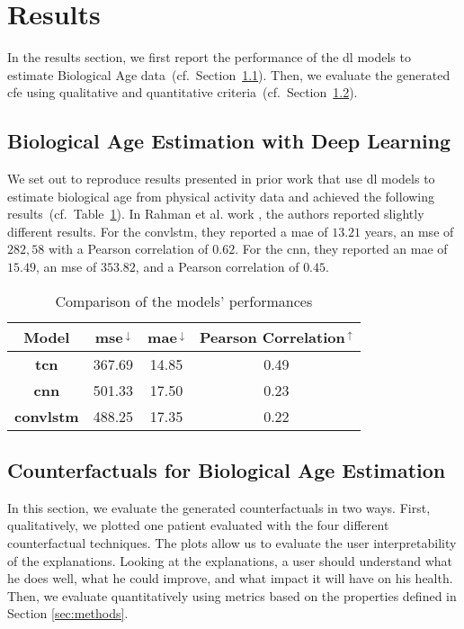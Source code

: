 \section{Results}
\label{sec:results}


In the results section, we first report the performance of the \gls{dl} models to estimate Biological Age data~(cf.~Section~\ref{sec:results:dl-training}). Then, we evaluate the generated \gls{cfe} using qualitative and quantitative criteria~(cf.~Section~\ref{sec:results:cf}).

\subsection{Biological Age Estimation with Deep Learning}
\label{sec:results:dl-training}
We set out to reproduce results presented in prior work \cite{pyrkov_extracting_2018, rahman_deep_2019} that use \gls{dl} models to estimate biological age from physical activity data and achieved the following results~(cf.~Table~\ref{tab:models}).
In Rahman et al. work \cite{rahman_deep_2019}, the authors reported slightly different results. For the \gls{convlstm}, they reported a \gls{mae} of $13.21$ years, an \gls{mse} of $282,58$ with a Pearson correlation of $0.62$. For the \gls{cnn}, they reported an \gls{mae} of $15.49$, an \gls{mse} of $353.82$, and a Pearson correlation of $0.45$.
\begin{table}[h!]
    \centering
    \begin{tabular}{cccc}
        \toprule
        \textbf{Model} & \textbf{\gls{mse}$\,{}^\downarrow$} & \textbf{\gls{mae}$\,{}^\downarrow$} & \makecell{\textbf{Pearson} \\\textbf{Correlation}$\,{}^\uparrow$}\\
        \midrule
        \textbf{\gls{tcn}} & 367.69 & 14.85 & 0.49\\
        \textbf{\gls{cnn}} & 501.33 & 17.50 & 0.23\\
        \textbf{\gls{convlstm}} & 488.25 & 17.35 & 0.22\\
        \bottomrule
    \end{tabular}
    \caption{Comparison of the models' performances}
    \label{tab:models}
\end{table}

\subsection{Counterfactuals for Biological Age Estimation}
\label{sec:results:cf}
In this section, we evaluate the generated counterfactuals in two ways. First, qualitatively, we plotted one patient evaluated with the four different counterfactual techniques. The plots allow us to evaluate the user interpretability of the explanations. Looking at the explanations, a user should understand what he does well, what he could improve, and what impact it will have on his health. Then, we evaluate quantitatively using metrics based on the properties defined in Section \ref{sec:methods}. 

